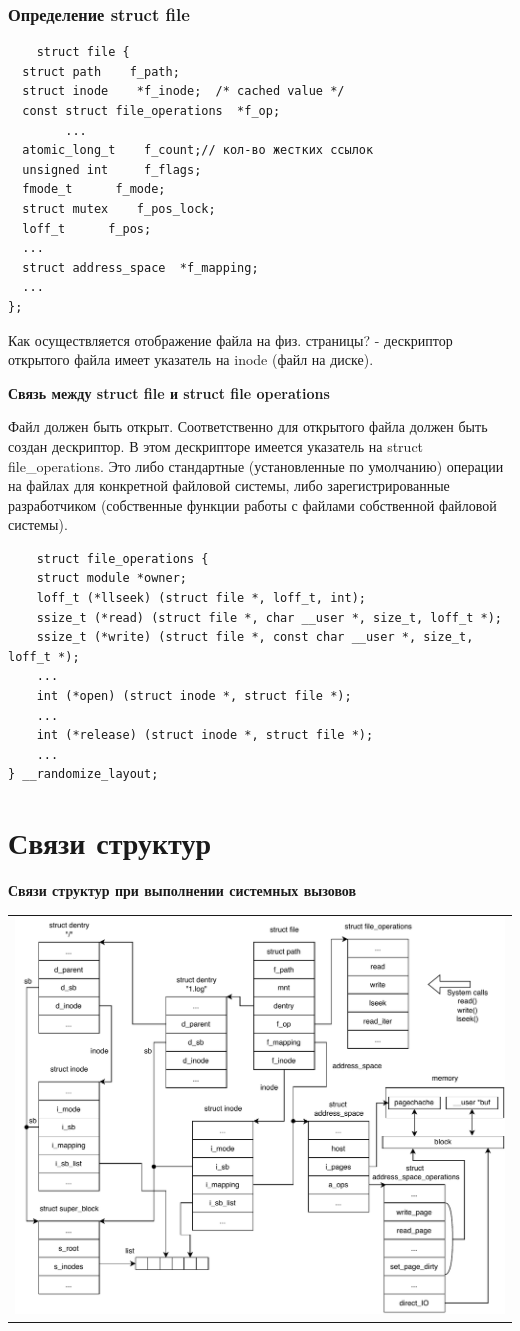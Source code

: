 \subsubsection{Определение struct file}
\begin{lstlisting}
    struct file {
  struct path    f_path;
  struct inode    *f_inode;  /* cached value */
  const struct file_operations  *f_op;
        ...
  atomic_long_t    f_count;// кол-во жестких ссылок
  unsigned int     f_flags;
  fmode_t      f_mode;
  struct mutex    f_pos_lock;
  loff_t      f_pos;
  ...
  struct address_space  *f_mapping;
  ...
};
\end{lstlisting}
Как осуществляется отображение файла на физ. страницы? - дескриптор открытого файла имеет указатель на inode (файл на диске).

\textbf{Связь между struct file и struct file operations}

Файл должен быть открыт. Соответственно для открытого файла должен быть создан дескриптор. В этом дескрипторе имеется указатель на struct file\_operations. Это либо стандартные (установленные по умолчанию) операции на файлах для конкретной файловой системы, либо зарегистрированные разработчиком (собственные функции работы с файлами собственной файловой системы).

\begin{lstlisting}
	struct file_operations {
	struct module *owner;
	loff_t (*llseek) (struct file *, loff_t, int);
	ssize_t (*read) (struct file *, char __user *, size_t, loff_t *);
	ssize_t (*write) (struct file *, const char __user *, size_t, loff_t *);
	...
	int (*open) (struct inode *, struct file *);
	...
	int (*release) (struct inode *, struct file *);
	...
} __randomize_layout;
\end{lstlisting}

\section{Связи структур}

\textbf{Связи структур при выполнении системных вызовов}
\begin{table}[H]
  \centering
  \begin{tabular}{p{1\linewidth}}
    \centering
    \includegraphics[width=0.8\linewidth]{./images/systemcalls_connect.pdf}
  \end{tabular}
\end{table}


